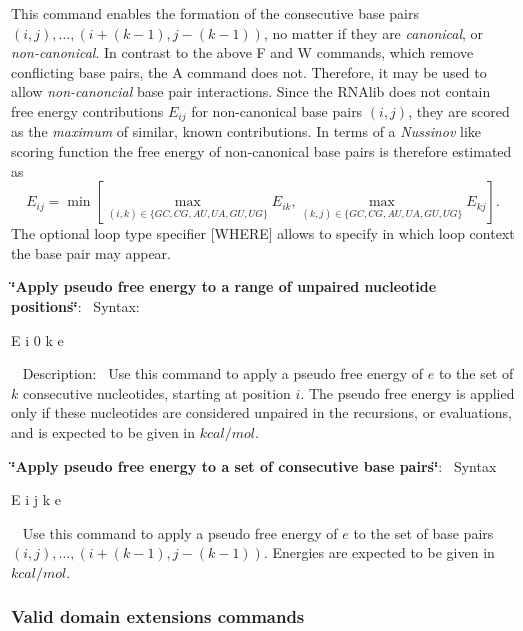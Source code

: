 \begin{DoxyEnumerate}
 This command enables the formation of the consecutive base pairs $ (i,j), \ldots, (i+(k-1), j-(k-1)) $, no matter if they are {\itshape canonical}, or {\itshape non-\/canonical}. In contrast to the above {\ttfamily F} and {\ttfamily W} commands, which remove conflicting base pairs, the {\ttfamily A} command does not. Therefore, it may be used to allow {\itshape non-\/canoncial} base pair interactions. Since the R\+N\+Alib does not contain free energy contributions $ E_{ij} $ for non-\/canonical base pairs $ (i,j) $, they are scored as the {\itshape maximum} of similar, known contributions. In terms of a {\itshape Nussinov} like scoring function the free energy of non-\/canonical base pairs is therefore estimated as \[ E_{ij} = \min \left[ \max_{(i,k) \in \{GC, CG, AU, UA, GU, UG\}} E_{ik}, \max_{(k,j) \in \{GC, CG, AU, UA, GU, UG\}} E_{kj} \right]. \] The optional loop type specifier {\ttfamily }\mbox{[}W\+H\+E\+RE\mbox{]} allows to specify in which loop context the base pair may appear.
\item {\bfseries \char`\"{}\+Apply pseudo free energy to a range of unpaired nucleotide positions\char`\"{}}\+:~\newline
 Syntax\+:
\begin{DoxyCode}
E i 0 k e 
\end{DoxyCode}
~\newline
 Description\+:~\newline
 Use this command to apply a pseudo free energy of $ e $ to the set of $ k $ consecutive nucleotides, starting at position $ i $. The pseudo free energy is applied only if these nucleotides are considered unpaired in the recursions, or evaluations, and is expected to be given in $ kcal / mol $.
\item {\bfseries \char`\"{}\+Apply pseudo free energy to a set of consecutive base pairs\char`\"{}}\+:~\newline
 Syntax
\begin{DoxyCode}
E i j k e 
\end{DoxyCode}
~\newline
 Use this command to apply a pseudo free energy of $ e $ to the set of base pairs $ (i,j), \ldots, (i+(k-1), j-(k-1)) $. Energies are expected to be given in $ kcal / mol $.
\end{DoxyEnumerate}\hypertarget{file_formats_domains_syntax}{}\subsubsection{Valid domain extensions commands}\label{file_formats_domains_syntax}

